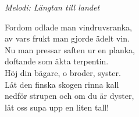 {\footnotesize\textit{Melodi: Längtan till landet}}\par
\vspace{10pt}
Fordom odlade man vindruvsranka,\\
av vars frukt man gjorde ädelt vin.\\
Nu man pressar saften ur en planka,\\
doftande som äkta terpentin.\\
Höj din bägare, o broder, syster.\\
Låt den finska skogen rinna kall\\
nedför strupen och om du är dyster,\\
låt oss supa upp en liten tall!
